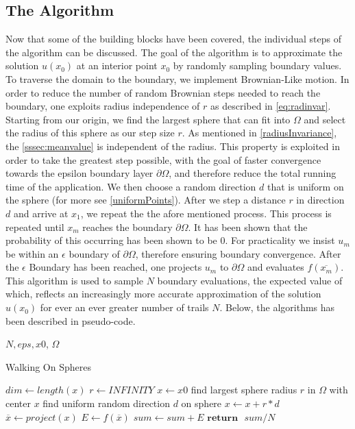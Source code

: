 \subsection{The Algorithm}\label{sssec:algorithm} %
Now that some of the building blocks have been covered, the individual steps of
the algorithm can be discussed.  The goal of the algorithm is to approximate
the solution $u(x_{0})$ at an interior point $x_{0}$ by randomly sampling boundary
values.  To traverse the domain  to the boundary, we implement Brownian-Like motion.
In order to reduce the number of random Brownian steps needed to reach the boundary,
one exploits radius independence of $r$ as described in \ref{eq:radinvar}.  Starting
from our origin, we find the largest sphere that can fit into $\Omega$ %
and select the radius of this sphere as our step size $r$. As mentioned in \ref{radiusInvariance},
the \ref{sssec:meanvalue} is independent of the radius.  This property is exploited
in order to take the greatest step possible, with the goal of faster convergence
towards the epsilon boundary layer $\partial \Omega$, and therefore reduce the
total running time of the application.  We then choose a random direction $d$
that is uniform on the sphere (for more see \ref{uniformPoints}).
After we step a distance $r$ in direction $d$ and arrive at $x_{1}$, we repeat the the afore mentioned process.
This process is repeated until $x_{m}$ reaches the boundary $\partial \Omega$.
It has been shown that the probability of this occurring has been shown to be 0\cite{kakutani1944}. %
 For practicality we insist $u_{m}$ be within an $\epsilon$ boundary of $\partial \Omega$,
 therefore ensuring boundary convergence.  After the $\epsilon$ Boundary has been reached,
 one projects $u_{m}$ to $\partial \Omega$ and evaluates $f(\overline{x_{m}})$.
This algorithm is used to sample $N$ boundary evaluations, the expected value of which,
reflects an increasingly more accurate approximation of the solution $u(x_{0})$
for ever an ever greater number of trails $N$\cite{Bornemann,DeLaurentis}.  Below, the algorithms has been
described in pseudo-code.
 \begin{algorithm}[H]{$N, eps, x0$, $\Omega$}
  \caption{Walking On Spheres}
 \label{alg:wos}
\begin{algorithmic}[1]
   \State $dim \gets length(x)$ 
   \State $ r \gets INFINITY$
   \label{lst:line:for}
   \State $x \leftarrow x0$
      \State find largest sphere radius $r$ in $\Omega$ with center $x$ \label{lst:line:radius}
      \State find uniform random direction $d$ on sphere \label{lst:line:direction}
      \State $ x \gets x + r * d$ 
 \EndWhile
 \State $\overline x \gets project(x)$ 
 \State $E \gets f(\overline x)$ 
 \State $sum \gets sum + E$  \label{lst:line:reduce}
  \EndFor
 \State $\textbf{return} \text{ } sum / N$ 

\end{algorithmic}
\end{algorithm}

